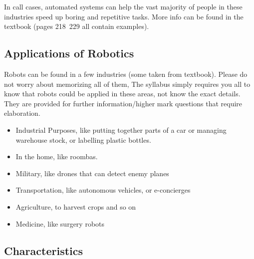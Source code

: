 \documentclass[../main.tex]{subfiles}
\begin{document}
In call cases, automated systems can help the vast majority of people in these industries speed up boring and repetitive tasks. More info can be found in the textbook (pages 218~229 all contain examples).

\subsection{Applications of Robotics}

Robots can be found in a few industries (some taken from textbook). Please do not worry about memorizing all of them, The syllabus simply requires you all to know that robots could be applied in these areas, not know the exact details. They are provided for further information/higher mark questions that require elaboration.

\begin{itemize}
    \item Industrial Purposes, like putting together parts of a car or managing warehouse stock, or labelling plastic bottles.
    \item In the home, like roombas.
    \item Military, like drones that can detect enemy planes
    \item Transportation, like autonomous vehicles, or e-concierges
    \item Agriculture, to harvest crops and so on
    \item Medicine, like surgery robots
\end{itemize}

\subsection{Characteristics}
\end{document}
